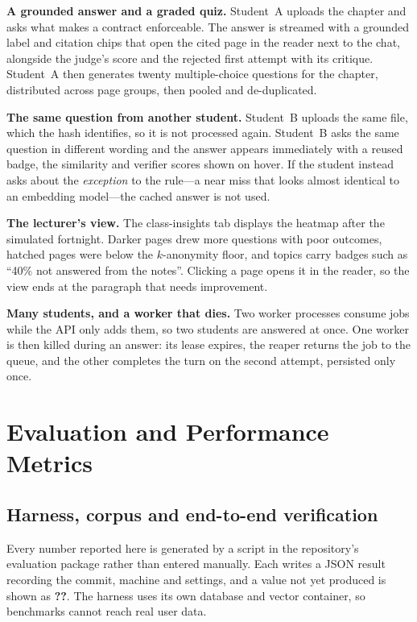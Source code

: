 \documentclass[conference]{IEEEtran}
\begin{document}
\textbf{A grounded answer and a graded quiz.} Student~A uploads the chapter and asks what makes a contract
enforceable. The answer is streamed with a grounded label and citation chips that open the cited page in
the reader next to the chat, alongside the judge's score and the rejected first attempt with its critique.
Student~A then generates twenty multiple-choice questions for the chapter, distributed across page groups,
then pooled and de-duplicated.

\textbf{The same question from another student.} Student~B uploads the same file, which the hash
identifies, so it is not processed again. Student~B asks the same question in different wording and the
answer appears immediately with a reused badge, the similarity and verifier scores shown on hover. If
the student instead asks about the \emph{exception} to the rule---a near miss that looks almost
identical to an embedding model---the cached answer is not used.

\textbf{The lecturer's view.} The class-insights tab displays the heatmap after the simulated fortnight.
Darker pages drew more questions with poor outcomes, hatched pages were below the $k$-anonymity floor, and
topics carry badges such as ``40\% not answered from the notes''. Clicking a page opens it in the reader, so
the view ends at the paragraph that needs improvement.

\textbf{Many students, and a worker that dies.} Two worker processes consume jobs while the API only adds
them, so two students are answered at once. One worker is then killed during an answer: its lease
expires, the reaper returns the job to the queue, and the other completes the turn on the second attempt,
persisted only once.

\section{Evaluation and Performance Metrics}

\subsection{Harness, corpus and end-to-end verification}

Every number reported here is generated by a script in the repository's evaluation package rather than entered
manually. Each writes a JSON result recording the commit, machine and settings, and a value not yet produced is
shown as \textbf{??}. The harness uses its own database and vector container, so benchmarks cannot reach real
user data.
\end{document}
